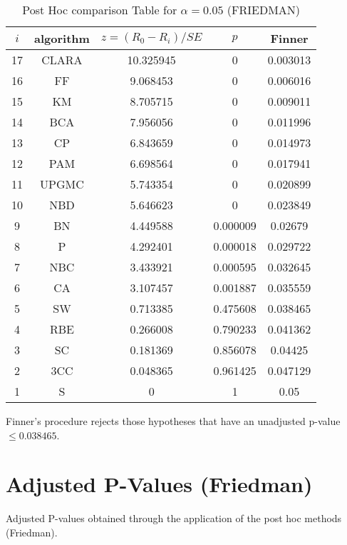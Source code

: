 \documentclass[a4paper,10pt]{article}
\begin{document}
\begin{landscape}
\begin{table}[!htp]
\centering\footnotesize
\begin{tabular}{ccccc}
$i$&algorithm&$z=(R_0 - R_i)/SE$&$p$&Finner\\
\hline17&CLARA&10.325945&0&0.003013\\16&FF&9.068453&0&0.006016\\15&KM&8.705715&0&0.009011\\14&BCA&7.956056&0&0.011996\\13&CP&6.843659&0&0.014973\\12&PAM&6.698564&0&0.017941\\11&UPGMC&5.743354&0&0.020899\\10&NBD&5.646623&0&0.023849\\9&BN&4.449588&0.000009&0.02679\\8&P&4.292401&0.000018&0.029722\\7&NBC&3.433921&0.000595&0.032645\\6&CA&3.107457&0.001887&0.035559\\5&SW&0.713385&0.475608&0.038465\\4&RBE&0.266008&0.790233&0.041362\\3&SC&0.181369&0.856078&0.04425\\2&3CC&0.048365&0.961425&0.047129\\1&S&0&1&0.05\\\hline
\end{tabular}
\caption{Post Hoc comparison Table for $\alpha=0.05$ (FRIEDMAN)}
\end{table}Finner's procedure rejects those hypotheses that have an unadjusted p-value $\le0.038465$.


\newpage

\section{Adjusted P-Values (Friedman)}


Adjusted P-values obtained through the application of the post hoc methods (Friedman).


\end{landscape}
\end{document}
